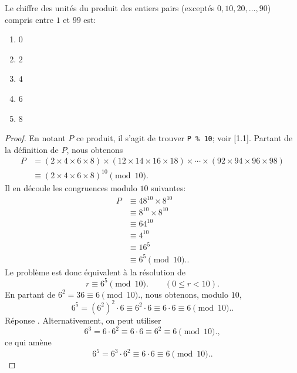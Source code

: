 % 
%
Le chiffre des unités du produit des entiers pairs (exceptés $0, 10, 20,\dots, 90$) compris entre $1$ et $99$ est:
%
\begin{enumerate}
  \item $0$
  \item $2$
  \item $4$
  \item $6$
  \item $8$
\end{enumerate}
%
\begin{proof}En notant $P$ ce produit, il s'agit de trouver \texttt{P \% 10}; voir [1.1]. Partant de %
la définition de $P$, nous obtenons
%
\begin{align}
P & =   (2 \times 4 \times 6 \times 8) \times (12 \times 14 \times 16 \times 18)\times \cdots \times %
(92 \times 94 \times 96 \times 98) \\
&\equiv (2 \times 4 \times 6 \times 8)^{10} \pmod{10}.
\end{align}
%
Il en découle les congruences modulo $10$ suivantes:
\begin{align}
P &\equiv 48^{10} \times 8^{10}\\
&\equiv 8^{10} \times 8^{10}\\
&\equiv 64^{10}\\
&\equiv 4^{10}\\
&\equiv 16^{5}\\
&\equiv 6^{5} \pmod{10}..
\end{align}
%
Le problème est donc équivalent à la résolution de 
%
\begin{equation}
r \equiv 6^{5} \pmod{10}. \qquad (0 \leq r < 10).
\end{equation}
%
En partant de $6^2 = 36 \equiv 6 \pmod{10}.$, nous obtenons, modulo $10$, 
%
\begin{equation}
  6^5 = (6^2)^2 \cdot 6 \equiv 6^2 \cdot 6 \equiv 6 \cdot 6 \equiv 6 \pmod{10}..
  \end{equation}
%
Réponse . Alternativement, on peut utiliser 
\begin{equation}
  6^3= 6 \cdot 6^2 \equiv 6 \cdot 6 \equiv 6^2 \equiv 6 \pmod{10}., 
\end{equation}
%
ce qui amène 
%
\begin{equation}
6^5 = 6^3 \cdot 6^2 \equiv 6 \cdot 6 \equiv 6 \pmod{10}..
\end{equation}
%
\end{proof}